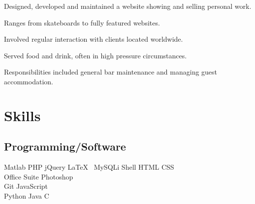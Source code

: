 \documentclass[]{cv_class}
\begin{document}
\begin{minipage}[t]{0.66\textwidth}
\begin{tightemize}
\item Designed, developed and maintained a website showing and selling personal work.
\item Ranges from skateboards to fully featured websites. 
\item Involved regular interaction with clients located worldwide.
\end{tightemize}
\sectionsep

\begin{tightemize}
\item Served food and drink, often in high pressure circumstances. 
\item Responsibilities included general bar maintenance and managing guest accommodation.
\end{tightemize}
\sectionsep


\section{Skills}
\subsection{Programming/Software}
 Matlab \textbullet{} PHP \textbullet{} jQuery \textbullet{} \LaTeX\ \textbullet{} MySQLi \textbullet{} Shell \textbullet{} HTML \textbullet{} CSS  \\ Office Suite \textbullet{} Photoshop\\
 Git \textbullet{} JavaScript\\
 Python \textbullet{} Java \textbullet{} C
\sectionsep
\vspace{1cm}

\end{minipage} 
\address{{home address:} Calder Cottage, St. Helen's Lane, Corbridge, Northumberland, NE455JD\\
\vfill
{} St. Catherine's College, Manor Rd., Oxford, OX13UJ}
\end{document}
